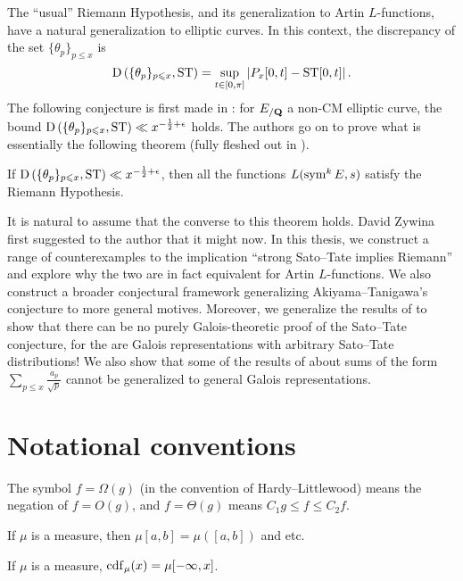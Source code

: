 The ``usual'' Riemann Hypothesis, and its generalization to Artin 
$L$-functions, have a natural generalization to elliptic curves. In this 
context, the discrepancy of the set $\{\theta_p\}_{p\leqslant x}$ is 
\[
	\operatorname{D}\left(\{\theta_p\}_{p\leqslant x},\mathrm{ST}\right) = \sup_{t\in [0,\pi]} \left| P_x[0,t] - \mathrm{ST}[0,t]\right| .
\]
The following conjecture is first made in \cite{akiyama-tanigawa-1999}: for 
$E_{/\mathbf{Q}}$ a non-CM elliptic curve, the bound 
$\operatorname{D}\left(\{\theta_p\}_{p\leqslant x},\mathrm{ST}\right)\ll x^{-\frac 1 2+\epsilon}$ 
holds. The authors go on to prove what is essentially the following theorem 
(fully fleshed out in \cite{mazur-2008}). 

\begin{theorem}
If $\operatorname{D}\left(\{\theta_p\}_{p\leqslant x},\mathrm{ST}\right)\ll x^{-\frac 1 2+\epsilon}$, 
then all the functions $L(\operatorname{sym}^k E, s)$ satisfy the Riemann Hypothesis. 
\end{theorem}

It is natural to assume that the converse to this theorem holds. David Zywina 
first suggested to the author that it might now. In this thesis, we construct a 
range of counterexamples to the implication ``strong Sato--Tate implies 
Riemann'' and explore why the two are in fact equivalent for Artin 
$L$-functions. We also construct a broader conjectural framework generalizing 
Akiyama--Tanigawa's conjecture to more general motives. Moreover, we generalize 
the results of \cite{pande-2011} to show that there can be no purely 
Galois-theoretic proof of the Sato--Tate conjecture, for the are Galois 
representations with arbitrary Sato--Tate distributions! We also show that 
some of the results of \cite{sarnak-2007} about sums of the form 
$\sum_{p\leqslant x} \frac{a_p}{\sqrt p}$ cannot be generalized to general 
Galois representations. 





\section{Notational conventions}

The symbol $f=\Omega(g)$ (in the convention of Hardy--Littlewood) means 
the negation of $f = O(g)$, and $f = \Theta(g)$ means 
$C_1 g \leqslant f \leqslant C_2 f$. 

If $\mu$ is a measure, then $\mu[a,b] = \mu([a,b])$ and etc. 

If $\mu$ is a measure, $\operatorname{cdf}_\mu(x) = \mu[-\infty,x]$. 
